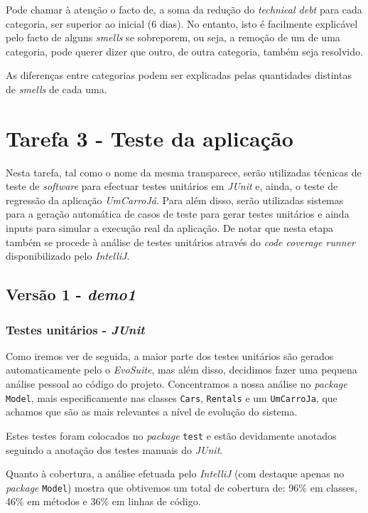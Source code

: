 \documentclass[a4paper]{report}
\begin{document}
Pode chamar à atenção o facto de, a soma da redução do \textit{technical debt} para cada categoria, ser superior ao inicial (6 dias).
No entanto, isto é facilmente explicável pelo facto de alguns \textit{smells} se sobreporem, ou seja, a remoção de um de uma categoria, pode querer dizer que outro, de outra categoria, também seja resolvido.

As diferenças entre categorias podem ser explicadas pelas quantidades distintas de \textit{smells} de cada uma.

\section{Tarefa 3 - Teste da aplicação}
Nesta tarefa, tal como o nome da mesma transparece, serão utilizadas técnicas de teste de \textit{software} para efectuar testes unitários em \textit{JUnit} e, ainda, o
teste de regressão da aplicação \textit{UmCarroJá}. Para além disso, serão utilizadas sistemas para a geração automática de casos de teste para gerar testes unitários e ainda inputs para simular a execução real da aplicação. De notar que nesta etapa também se procede à análise de testes unitários através do \textit{code coverage runner} disponibilizado pelo \textit{IntelliJ}.

\subsection{Versão 1 - \textit{demo1}}

\subsubsection{Testes unitários - \textit{JUnit}}

Como iremos ver de seguida, a maior parte dos testes unitários são gerados automaticamente pelo o \textit{EvoSuite}, mas além disso, decidimos fazer uma pequena análise pessoal ao código do projeto.
Concentramos a nossa análise no \textit{package} \texttt{Model}, mais especificamente nas classes \texttt{Cars}, \texttt{Rentals} e um \texttt{UmCarroJa}, que achamos que são as mais relevantes a nível de evolução do sistema.

Estes testes foram colocados no \textit{package} \texttt{test} e estão devidamente anotados seguindo a anotação dos testes manuais do \textit{JUnit}.

Quanto à cobertura, a análise efetuada pelo \textit{IntelliJ} (com destaque apenas no \textit{package} \texttt{Model}) mostra que obtivemos um total de cobertura de: 96\% em classes, 46\% em métodos e 36\% em linhas de código.
\end{document}
